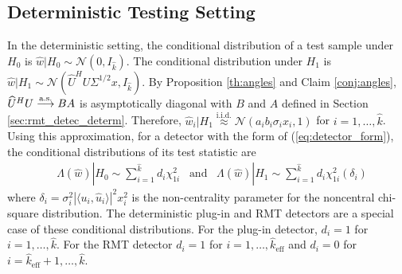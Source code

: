 \subsection{Deterministic Testing Setting}\label{sec:roc_determ}
In the deterministic setting, the conditional distribution of a test sample under $H_0$ is $\widehat{w}|H_0\sim\mathcal{N}(0,I_{\widehat{k}})$. The conditional distribution under $H_1$ is $\widehat{w}|H_1\sim\mathcal{N}(\widehat{U}^HU\Sigma^{1/2} x,I_{\widehat{k}})$. By Proposition \ref{th:angles} and Claim \ref{conj:angles}, $\widehat{U}^HU\overset{\textrm{a.s.}}{\longrightarrow} BA$ is asymptotically diagonal with $B$ and $A$ defined in Section \ref{sec:rmt_detec_determ}. Therefore, $\widehat{w}_i|H_1\overset{\text{i.i.d.}}{\approx}\mathcal{N}(a_ib_i\sigma_ix_i,1)$ for $i=1,\dots,\widehat{k}$. Using this approximation, for a detector with the form of (\ref{eq:detector_form}), the conditional distributions of its test statistic are
\begin{equation}\label{eq:determ_stat_distr}
\begin{aligned}
&\Lambda(\widehat{w})|H_0 \sim \sum_{i=1}^{\widehat{k}} d_i\chi_{1i}^2 \,\,\,\text{ and }\,\,\, \Lambda(\widehat{w})|H_1\sim\sum_{i=1}^{\widehat{k}}d_i\chi_{1i}^2(\delta_i)
\end{aligned}
\end{equation}
where $\delta_i=\sigma_i^2|\langle u_i,\widehat{u}_i\rangle|^2x_i^2$ is the non-centrality parameter for the noncentral chi-square distribution. The deterministic plug-in and RMT detectors are a special case of these conditional distributions. For the plug-in detector, $d_i=1$ for $i=1,\dots,\widehat{k}$. For the RMT detector $d_i=1$ for $i=1,\dots,\widehat{k}_{\text{eff}}$ and $d_i=0$ for $i=\widehat{k}_{\text{eff}}+1,\dots,\widehat{k}$.


